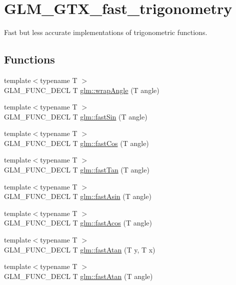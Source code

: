 \hypertarget{group__gtx__fast__trigonometry}{}\section{G\+L\+M\+\_\+\+G\+T\+X\+\_\+fast\+\_\+trigonometry}
\label{group__gtx__fast__trigonometry}


Fast but less accurate implementations of trigonometric functions.  


\subsection*{Functions}
\begin{DoxyCompactItemize}
\item 
{\footnotesize template$<$typename T $>$ }\\G\+L\+M\+\_\+\+F\+U\+N\+C\+\_\+\+D\+E\+CL T \hyperlink{group__gtx__fast__trigonometry_ga069527c6dbd64f53435b8ebc4878b473}{glm\+::wrap\+Angle} (T angle)
\item 
{\footnotesize template$<$typename T $>$ }\\G\+L\+M\+\_\+\+F\+U\+N\+C\+\_\+\+D\+E\+CL T \hyperlink{group__gtx__fast__trigonometry_ga0aab3257bb3b628d10a1e0483e2c6915}{glm\+::fast\+Sin} (T angle)
\item 
{\footnotesize template$<$typename T $>$ }\\G\+L\+M\+\_\+\+F\+U\+N\+C\+\_\+\+D\+E\+CL T \hyperlink{group__gtx__fast__trigonometry_gab34c8b45c23c0165a64dcecfcc3b302a}{glm\+::fast\+Cos} (T angle)
\item 
{\footnotesize template$<$typename T $>$ }\\G\+L\+M\+\_\+\+F\+U\+N\+C\+\_\+\+D\+E\+CL T \hyperlink{group__gtx__fast__trigonometry_gaf29b9c1101a10007b4f79ee89df27ba2}{glm\+::fast\+Tan} (T angle)
\item 
{\footnotesize template$<$typename T $>$ }\\G\+L\+M\+\_\+\+F\+U\+N\+C\+\_\+\+D\+E\+CL T \hyperlink{group__gtx__fast__trigonometry_ga562cb62c51fbfe7fac7db0bce706b81f}{glm\+::fast\+Asin} (T angle)
\item 
{\footnotesize template$<$typename T $>$ }\\G\+L\+M\+\_\+\+F\+U\+N\+C\+\_\+\+D\+E\+CL T \hyperlink{group__gtx__fast__trigonometry_ga9721d63356e5d94fdc4b393a426ab26b}{glm\+::fast\+Acos} (T angle)
\item 
{\footnotesize template$<$typename T $>$ }\\G\+L\+M\+\_\+\+F\+U\+N\+C\+\_\+\+D\+E\+CL T \hyperlink{group__gtx__fast__trigonometry_ga8d197c6ef564f5e5d59af3b3f8adcc2c}{glm\+::fast\+Atan} (T y, T x)
\item 
{\footnotesize template$<$typename T $>$ }\\G\+L\+M\+\_\+\+F\+U\+N\+C\+\_\+\+D\+E\+CL T \hyperlink{group__gtx__fast__trigonometry_gae25de86a968490ff56856fa425ec9d30}{glm\+::fast\+Atan} (T angle)
\end{DoxyCompactItemize}


